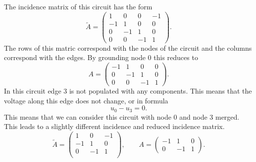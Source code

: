 The incidence matrix of this circuit has the form
\begin{displaymath}
	\tilde{A} = 
	\left(
	\begin{matrix}
		1 & 0 & 0 & -1 \\
		-1 & 1 & 0 & 0 \\
		0 & -1 & 1 & 0 \\
		0 & 0 & -1 & 1 
	\end{matrix}
	\right).
\end{displaymath}
The rows of this matric correspond with the nodes of the circuit and the columns correspond with the edges. By grounding node 0 this reduces to
\begin{displaymath}
	A = 
	\left(
	\begin{matrix}
		-1 & 1 & 0 & 0 \\
		0 & -1 & 1 & 0 \\
		0 & 0 & -1 & 1 
	\end{matrix}
	\right).
\end{displaymath}
In this circuit edge 3 is not populated with any components. This means that the voltage along this edge does not change, or in formula
\begin{displaymath}
	u_0 - u_3 = 0.
\end{displaymath}
This means that we can consider this circuit with node 0 and node 3 merged. This leads to a slightly different incidence and reduced incidence matrix.
\begin{displaymath}
	\tilde{A} = 
	\left(
	\begin{matrix}
		1 & 0 & -1 \\
		-1 & 1 & 0 \\
		0 & -1 & 1 \\
	\end{matrix}
	\right),
	\qquad
	A = 
	\left(
	\begin{matrix}
		-1 & 1 & 0 \\
		0 & -1 & 1 
	\end{matrix}
	\right).
\end{displaymath}

